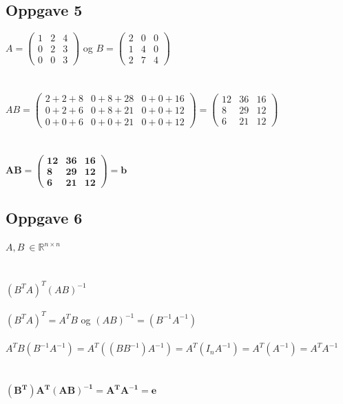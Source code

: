 \documentclass{article}
\newcommand{\vect}[1]{\begin{pmatrix} #1 \end{pmatrix}}
\begin{document}
\subsection*{Oppgave 5}
\(A = \vect{1&2&4\\0&2&3\\0&0&3}\) og \(B = \vect{2&0&0\\1&4&0\\2&7&4}\)
\\\\\\
\(AB = \begin{pmatrix}
    2+2+8 & 0+8+28 & 0+0+16 \\
    0+2+6 & 0+8+21 & 0+0+12 \\
    0+0+6 & 0+0+21 & 0+0+12
\end{pmatrix} = \begin{pmatrix}
    12 & 36 & 16 \\
    8 & 29 & 12 \\
    6 & 21 & 12
\end{pmatrix}\)
\\\\\\
\(\mathbf{AB = \begin{pmatrix}
    12 & 36 & 16 \\
    8 & 29 & 12 \\
    6 & 21 & 12
\end{pmatrix} = b}\)
\newpage

\subsection*{Oppgave 6}
\(A, B\ \in \mathbb{R}^{n\times n}\)
\\\\\\
\((B^TA)^T(AB)^{-1}\)
\\\\
\((B^TA)^T = A^TB\)  \quad og \quad \((AB)^{-1} = (B^{-1}A^{-1})\)
\\\\
\(A^TB(B^{-1}A^{-1}) = A^T((BB^{-1})A^{-1}) = A^T(I_nA^{-1}) = A^T(A^{-1}) = A^TA^{-1}\)
\\\\\\
\(\mathbf{(B^T)A^T(AB)^{-1} = A^TA^{-1} = e}\)
\\\\\\
\end{document}

